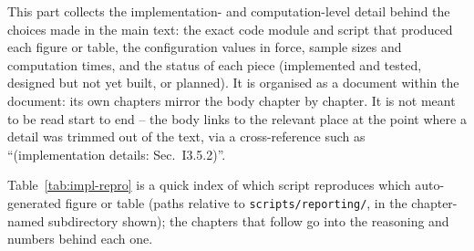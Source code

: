 This part collects the implementation- and computation-level detail behind the choices
made in the main text: the exact code module and script that produced each figure or
table, the configuration values in force, sample sizes and computation times, and the
status of each piece (implemented and tested, designed but not yet built, or planned). It
is organised as a document within the document: its own chapters mirror the body chapter
by chapter. It is not meant to be read start to
end -- the body links to the relevant place at the point where a detail was trimmed out of
the text, via a cross-reference such as ``(implementation details: Sec.~I3.5.2)''.


\bigskip

Table~\ref{tab:impl-repro} is a quick index of which script reproduces which
auto-generated figure or table (paths relative to \texttt{scripts/reporting/}, in the
chapter-named subdirectory shown); the chapters that follow go into the reasoning and
numbers behind each one.

